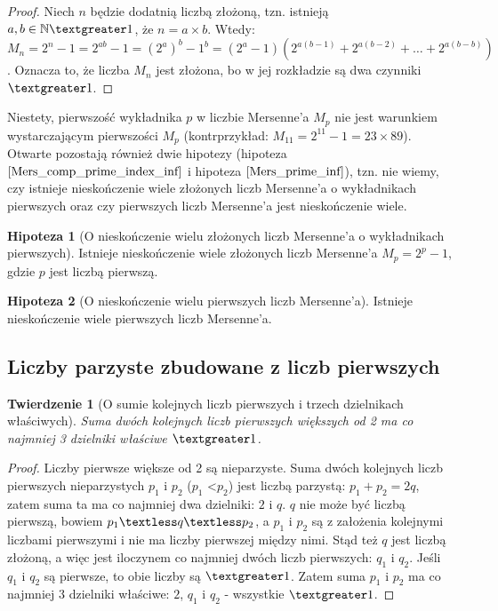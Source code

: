 \documentclass[10pt,onecolumn]{article}
\newtheorem{theorem}{Twierdzenie}
\theoremstyle{definition}
\theoremstyle{hypothesis}
\newtheorem{hypothesis}{Hipoteza}
\theoremstyle{capability}
\begin{document}
\begin{proof}
Niech $n$ będzie dodatnią liczbą złożoną, tzn. istnieją $a, b \in \mathbb{N} \textgreater 1$, że $n = a \times b$. Wtedy: $M_n = 2^n - 1 = 2^{ab} - 1 = (2^a)^b - 1^b = (2^a - 1)(2^{a(b - 1)} + 2^{a(b - 2)} + \ldots + 2^{a(b-b)})$. Oznacza to, że liczba $M_n$ jest złożona, bo w jej rozkładzie są dwa czynniki $\textgreater 1$.
\end{proof}

Niestety, pierwszość wykładnika $p$ w liczbie Mersenne'a $M_p$ nie jest warunkiem wystarczającym pierwszości $M_p$ (kontrprzykład: $M_{11} = 2^{11} - 1 = 23 \times 89$). Otwarte pozostają również dwie hipotezy (hipoteza $\ref{Mers_comp_prime_index_inf}$ i hipoteza $\ref{Mers_prime_inf}$), tzn. nie wiemy, czy istnieje nieskończenie wiele złożonych liczb Mersenne'a o wykładnikach pierwszych oraz czy pierwszych liczb Mersenne'a jest nieskończenie wiele.

\begin{hypothesis}[O nieskończenie wielu złożonych liczb Mersenne'a o wykładnikach pierwszych]
Istnieje nieskończenie wiele złożonych liczb Mersenne'a $M_p = 2^p - 1$, gdzie $p$ jest liczbą pierwszą.
\label{Mers_comp_prime_index_inf}
\end{hypothesis}

\begin{hypothesis}[O nieskończenie wielu pierwszych liczb Mersenne'a]
Istnieje nieskończenie wiele pierwszych liczb Mersenne'a.
\label{Mers_prime_inf}
\end{hypothesis}

\subsection{Liczby parzyste zbudowane z liczb pierwszych}

\begin{theorem}[O sumie kolejnych liczb pierwszych i trzech dzielnikach właściwych]
Suma dwóch kolejnych liczb pierwszych większych od 2 ma co najmniej 3 dzielniki właściwe $\textgreater 1$.
\end{theorem}
\begin{proof}
Liczby pierwsze większe od 2 są nieparzyste. Suma dwóch kolejnych liczb pierwszych nieparzystych $p_1$ i $p_2$ ($p_1$ \textless $p_2$) jest liczbą parzystą: $p_1 + p_2 = 2q$, zatem suma ta ma co najmniej dwa dzielniki: $2$ i $q$. $q$ nie może być liczbą pierwszą, bowiem $p_1 \textless q \textless p_2$, a $p_1$ i $p_2$ są z założenia kolejnymi liczbami pierwszymi i nie ma liczby pierwszej między nimi. Stąd też $q$ jest liczbą złożoną, a więc jest iloczynem co najmniej dwóch liczb pierwszych: $q_1$ i $q_2$. Jeśli $q_1$ i $q_2$ są pierwsze, to obie liczby są $\textgreater 1$. Zatem suma $p_1$ i $p_2$ ma co najmniej $3$ dzielniki właściwe: $2$, $q_1$ i $q_2$ - wszystkie $\textgreater 1$.
\end{proof}
\end{document}
